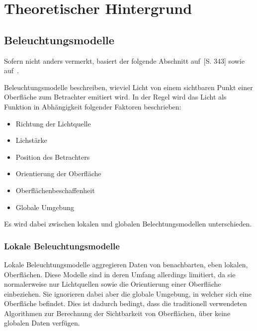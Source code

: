 
\chapter{Theoretischer Hintergrund}
\label{chap:theoretical_background}

\section{Beleuchtungsmodelle}
\label{sec:illumination_models}

Sofern nicht anders vermerkt, basiert der folgende Abschnitt auf~\cite{whitted_improved_1980}[S. 343] sowie auf~\cite{hughes_computer_2013}.

Beleuchtungsmodelle beschreiben, wieviel Licht von einem sichtbaren Punkt einer Oberfläche zum Betrachter emitiert wird. In der Regel wird das Licht als Funktion in Abhängigkeit folgender Faktoren beschrieben:
\begin{itemize}
    \item Richtung der Lichtquelle \item Lichstärke
    \item Position des Betrachters
    \item Orientierung der Oberfläche
    \item Oberflächenbeschaffenheit
    \item Globale Umgebung
\end{itemize}

Es wird dabei zwischen lokalen und globalen Belechtungsmodellen unterschieden.

\subsection{Lokale Beleuchtungsmodelle}
\label{subsec:local_illumination_models}

Lokale Beleuchtungsmodelle aggregieren Daten von benachbarten, eben lokalen, Oberflächen. Diese Modelle sind in deren Umfang allerdings limitiert, da sie normalerweise nur Lichtquellen sowie die Orientierung einer Oberfläche einbeziehen. Sie ignorieren dabei aber die globale Umgebung, in welcher sich eine Oberfläche befindet.
Dies ist dadurch bedingt, dass die traditionell verwendeten Algorithmen zur Berechnung der Sichtbarkeit von Oberflächen, über keine globalen Daten verfügen.

